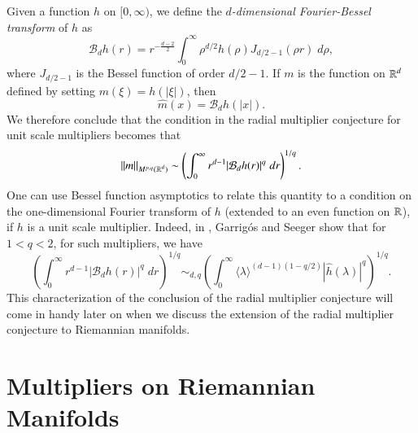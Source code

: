 Given a function $h$ on $[0,\infty)$, we define the \emph{$d$-dimensional Fourier-Bessel transform} of $h$ as
%
 \[ \mathcal{B}_d h(r) = r^{- \frac{d-2}{2}} \int_0^\infty \rho^{d/2} h(\rho) J_{d/2-1}(\rho r)\; d\rho, \]
%
where $J_{d/2-1}$ is the Bessel function of order $d/2 - 1$. If $m$ is the function on $\operatorname{\mathbb{R}}^d$ defined by setting $m(\xi) = h(|\xi|)$, then
%
\[ \widehat{m}(x) = \mathcal{B}_d h(|x|). \]
%
We therefore conclude that the condition in the radial multiplier conjecture for unit scale multipliers becomes that
%
\[ \| m \|_{M^{p,q}(\operatorname{\mathbb{R}}^d)} \sim \left( \int_0^\infty r^{d-1} |\mathcal{B}_d h(r)|^q\; dr \right)^{1/q}. \]
%
%
%
One can use Bessel function asymptotics to relate this quantity to a condition on the one-dimensional Fourier transform of $h$ (extended to an even function on $\operatorname{\mathbb{R}}$), if $h$ is a unit scale multiplier. Indeed, in \cite{GarrigosandSeeger}, Garrig\'{o}s and Seeger show that for $1 < q < 2$, for such multipliers, we have
%
\[ \left( \int_0^\infty r^{d-1} |\mathcal{B}_d h(r)|^q\; dr \right)^{1/q} \sim_{d,q} \left( \int_0^\infty \langle \lambda \rangle^{(d-1)(1 - q/2)} |\widehat{h}(\lambda)|^q \right)^{1/q}. \]
%
This characterization of the conclusion of the radial multiplier conjecture will come in handy later on when we discuss the extension of the radial multiplier conjecture to Riemannian manifolds.

\section{Multipliers on Riemannian Manifolds}

